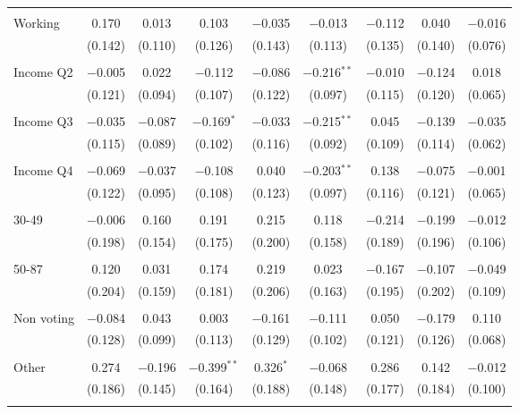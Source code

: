 \begin{tabular}{@{\extracolsep{5pt}}lcccccccc}
  & & & & & & & & \\ 
 Working & 0.170 & 0.013 & 0.103 & $-$0.035 & $-$0.013 & $-$0.112 & 0.040 & $-$0.016 \\ 
  & (0.142) & (0.110) & (0.126) & (0.143) & (0.113) & (0.135) & (0.140) & (0.076) \\ 
  & & & & & & & & \\ 
 Income Q2 & $-$0.005 & 0.022 & $-$0.112 & $-$0.086 & $-$0.216$^{**}$ & $-$0.010 & $-$0.124 & 0.018 \\ 
  & (0.121) & (0.094) & (0.107) & (0.122) & (0.097) & (0.115) & (0.120) & (0.065) \\ 
  & & & & & & & & \\ 
 Income Q3 & $-$0.035 & $-$0.087 & $-$0.169$^{*}$ & $-$0.033 & $-$0.215$^{**}$ & 0.045 & $-$0.139 & $-$0.035 \\ 
  & (0.115) & (0.089) & (0.102) & (0.116) & (0.092) & (0.109) & (0.114) & (0.062) \\ 
  & & & & & & & & \\ 
 Income Q4 & $-$0.069 & $-$0.037 & $-$0.108 & 0.040 & $-$0.203$^{**}$ & 0.138 & $-$0.075 & $-$0.001 \\ 
  & (0.122) & (0.095) & (0.108) & (0.123) & (0.097) & (0.116) & (0.121) & (0.065) \\ 
  & & & & & & & & \\ 
 30-49 & $-$0.006 & 0.160 & 0.191 & 0.215 & 0.118 & $-$0.214 & $-$0.199 & $-$0.012 \\ 
  & (0.198) & (0.154) & (0.175) & (0.200) & (0.158) & (0.189) & (0.196) & (0.106) \\ 
  & & & & & & & & \\ 
 50-87 & 0.120 & 0.031 & 0.174 & 0.219 & 0.023 & $-$0.167 & $-$0.107 & $-$0.049 \\ 
  & (0.204) & (0.159) & (0.181) & (0.206) & (0.163) & (0.195) & (0.202) & (0.109) \\ 
  & & & & & & & & \\ 
 Non voting & $-$0.084 & 0.043 & 0.003 & $-$0.161 & $-$0.111 & 0.050 & $-$0.179 & 0.110 \\ 
  & (0.128) & (0.099) & (0.113) & (0.129) & (0.102) & (0.121) & (0.126) & (0.068) \\ 
  & & & & & & & & \\ 
 Other & 0.274 & $-$0.196 & $-$0.399$^{**}$ & 0.326$^{*}$ & $-$0.068 & 0.286 & 0.142 & $-$0.012 \\ 
  & (0.186) & (0.145) & (0.164) & (0.188) & (0.148) & (0.177) & (0.184) & (0.100) \\ 
  & & & & & & & & \\ 

\end{tabular}
